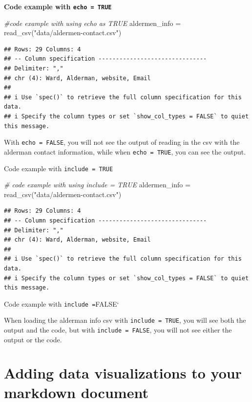 \documentclass[
  krantz2]{krantz}
\makeatletter
\newenvironment{Shaded}{\begin{snugshade}}{\end{snugshade}}
\newcommand{\CommentTok}[1]{\textcolor[rgb]{0.37,0.37,0.37}{\textit{#1}}}
\newcommand{\FunctionTok}[1]{\textcolor[rgb]{0,0,0}{#1}}
\newcommand{\NormalTok}[1]{#1}
\newcommand{\OtherTok}[1]{\textcolor[rgb]{0.37,0.37,0.37}{#1}}
\newcommand{\StringTok}[1]{\textcolor[rgb]{0.5,0.5,0.5}{#1}}
\newenvironment{kframe}{%
\medskip{}
\setlength{\fboxsep}{.8em}
 \def\at@end@of@kframe{}%
 \ifinner\ifhmode%
  \def\at@end@of@kframe{\end{minipage}}%
  \begin{minipage}{\columnwidth}%
 \fi\fi%
 \def\FrameCommand##1{\hskip\@totalleftmargin \hskip-\fboxsep
 \colorbox{shadecolor}{##1}\hskip-\fboxsep
     \hskip-\linewidth \hskip-\@totalleftmargin \hskip\columnwidth}%
 \MakeFramed {\advance\hsize-\width
   \@totalleftmargin\z@ \linewidth\hsize
   \@setminipage}}%
 {\par\unskip\endMakeFramed%
 \at@end@of@kframe}
\renewenvironment{Shaded}{\begin{kframe}}{\end{kframe}}
\makeatother
\begin{document}
\textbf{Code example with \texttt{echo\ =\ TRUE}}

\begin{Shaded}
\begin{Highlighting}[]
\CommentTok{\#code example with using echo as TRUE}
\NormalTok{aldermen\_info }\OtherTok{=} \FunctionTok{read\_csv}\NormalTok{(}\StringTok{"data/aldermen{-}contact.csv"}\NormalTok{)}
\end{Highlighting}
\end{Shaded}

\begin{verbatim}
## Rows: 29 Columns: 4
## -- Column specification -------------------------------
## Delimiter: ","
## chr (4): Ward, Alderman, website, Email
##
## i Use `spec()` to retrieve the full column specification for this data.
## i Specify the column types or set `show_col_types = FALSE` to quiet this message.
\end{verbatim}

With \texttt{echo\ =\ FALSE}, you will not see the output of reading in the csv with the alderman contact information, while when \texttt{echo\ =\ TRUE}, you can see the output.

Code example with \texttt{include\ =\ TRUE}

\begin{Shaded}
\begin{Highlighting}[]
\CommentTok{\# code example with using include = TRUE }
\NormalTok{aldermen\_info }\OtherTok{=} \FunctionTok{read\_csv}\NormalTok{(}\StringTok{"data/aldermen{-}contact.csv"}\NormalTok{)}
\end{Highlighting}
\end{Shaded}

\begin{verbatim}
## Rows: 29 Columns: 4
## -- Column specification -------------------------------
## Delimiter: ","
## chr (4): Ward, Alderman, website, Email
##
## i Use `spec()` to retrieve the full column specification for this data.
## i Specify the column types or set `show_col_types = FALSE` to quiet this message.
\end{verbatim}

Code example with \texttt{include\ =}FALSE`

When loading the alderman info csv with \texttt{include\ =\ TRUE}, you will see both the output and the code, but with \texttt{include\ =\ FALSE}, you will not see either the output or the code.

\hypertarget{adding-data-visualizations-to-your-markdown-document}{%
\section{Adding data visualizations to your markdown document}\label{adding-data-visualizations-to-your-markdown-document}}
\end{document}
